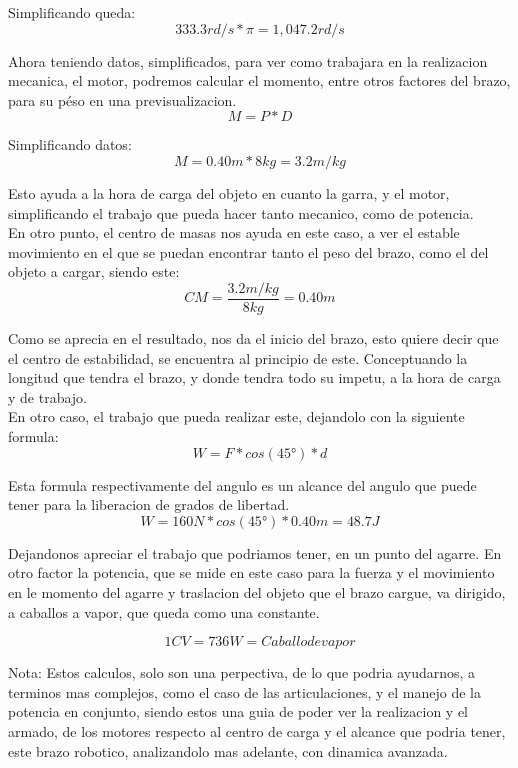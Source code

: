 \documentclass[14pt,a4paper]{article}
\begin{document}
Simplificando \pi queda:\\

$$ 333.3 rd/s* \pi= 1,047.2 rd/s $$

Ahora teniendo datos, simplificados, para ver como trabajara en la realizacion mecanica, el motor, podremos calcular el momento, entre otros factores del brazo, para su péso en una previsualizacion.\\

$$ M= P*D $$

Simplificando datos:\\

$$ M=0.40m*8kg= 3.2 m/kg $$

Esto ayuda a la hora de carga del objeto en cuanto la garra, y el motor, simplificando el trabajo que pueda hacer tanto mecanico, como de potencia.\\
En otro punto, el centro de masas nos ayuda en este caso, a ver el estable movimiento en el que se puedan encontrar tanto el peso del brazo, como el del objeto a cargar, siendo este:\\

$$ CM=\frac{3.2 m/kg}{8kg}= 0.40m $$

Como se aprecia en el resultado, nos da el inicio del brazo, esto quiere decir que el centro de estabilidad, se encuentra al principio de este. Conceptuando la longitud que tendra el brazo, y donde tendra todo su impetu, a la hora de carga y de trabajo.\\
En otro caso, el trabajo que pueda realizar este, dejandolo con la siguiente formula:\\

$$ W= F*cos(45°)*d $$

Esta formula respectivamente del angulo es un alcance del angulo que puede tener para la liberacion de grados de libertad.\\

$$ W= 160N*cos(45°)*0.40m= 48.7 J $$

Dejandonos apreciar el trabajo que podriamos tener, en un punto del agarre. En otro factor la potencia, que se mide en este caso para la fuerza y el movimiento en le momento del agarre y traslacion del objeto que el brazo cargue, va dirigido, a caballos a vapor, que queda como una constante.

$$ 1CV= 736W= Caballo de vapor $$

Nota: Estos calculos, solo son una perpectiva, de lo que podria ayudarnos, a terminos mas complejos, como el caso de las articulaciones, y el manejo de la potencia en conjunto, siendo estos una guia de poder ver la realizacion y el armado, de los motores respecto al centro de carga y el alcance que podria tener, este brazo robotico, analizandolo mas adelante, con dinamica avanzada.\\
\end{document}
